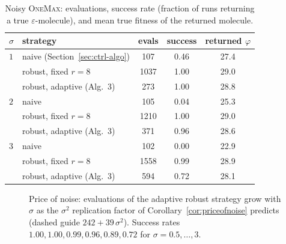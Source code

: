\documentclass[11pt,a4paper]{article}
\begin{document}
\begin{table}[ht]
\centering
\caption{Noisy \textsc{OneMax}: evaluations, success rate (fraction of runs
  returning a true $\varepsilon$-molecule), and mean true fitness of the
  returned molecule.}
\label{tab:noise}
\renewcommand{\arraystretch}{1.12}
\begin{tabular}{@{}llccc@{}}
\toprule
$\sigma$ & strategy & evals & success & returned $\varphi$ \\
\midrule
$1$ & naive (Section~\ref{sec:ctrl-algo}) & 107  & 0.46 & 27.4 \\
    & robust, fixed $r=8$          & 1037 & 1.00 & 29.0 \\
    & robust, adaptive (Alg.~3)    & 273  & 1.00 & 28.8 \\
\midrule
$2$ & naive                        & 105  & 0.04 & 25.3 \\
    & robust, fixed $r=8$          & 1210 & 1.00 & 29.0 \\
    & robust, adaptive (Alg.~3)    & 371  & 0.96 & 28.6 \\
\midrule
$3$ & naive                        & 102  & 0.00 & 22.9 \\
    & robust, fixed $r=8$          & 1558 & 0.99 & 28.9 \\
    & robust, adaptive (Alg.~3)    & 594  & 0.72 & 28.1 \\
\bottomrule
\end{tabular}
\end{table}

\begin{figure}[ht]
\centering
{}
\caption{Price of noise: evaluations of the adaptive robust strategy grow
  with $\sigma$ as the $\sigma^2$ replication factor of
  Corollary~\ref{cor:priceofnoise} predicts (dashed guide $242+39\,\sigma^2$).
  Success rates $1.00,1.00,0.99,0.96,0.89,0.72$ for $\sigma=0.5,\dots,3$.}
\label{fig:priceofnoise}
\end{figure}
\end{document}
